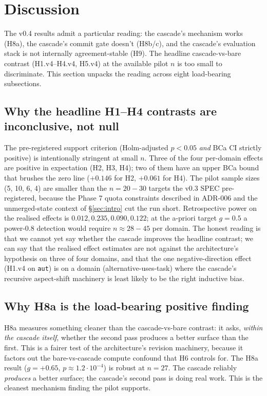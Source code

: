 \section{Discussion}\label{sec:discussion}

The v0.4 results admit a particular reading: the cascade's mechanism works (H8a), the cascade's commit gate doesn't (H8b/c), and the cascade's evaluation stack is not internally agreement-stable (H9). The headline cascade-vs-bare contrast (H1.v4--H4.v4, H5.v4) at the available pilot $n$ is too small to discriminate. This section unpacks the reading across eight load-bearing subsections.

\subsection{Why the headline H1--H4 contrasts are inconclusive, not null}

The pre-registered support criterion (Holm-adjusted $p<0.05$ \emph{and} BCa CI strictly positive) is intentionally stringent at small $n$. Three of the four per-domain effects are positive in expectation (H2, H3, H4); two of them have an upper BCa bound that brushes the zero line ($+0.146$ for H2, $+0.061$ for H4). The pilot sample sizes (5, 10, 6, 4) are smaller than the $n=20{-}30$ targets the v0.3 SPEC pre-registered, because the Phase 7 quota constraints described in ADR-006 and the unmerged-state context of \S\ref{sec:intro} cut the run short. Retrospective power on the realised effects is $0.012, 0.235, 0.090, 0.122$; at the a-priori target $g=0.5$ a power-0.8 detection would require $n\approx 28{-}45$ per domain. The honest reading is that we cannot yet say whether the cascade improves the headline contrast; we can say that the realised effect estimates are not against the architecture's hypothesis on three of four domains, and that the one negative-direction effect (H1.v4 on \texttt{aut}) is on a domain (alternative-uses-task) where the cascade's recursive aspect-shift machinery is least likely to be the right inductive bias.

\subsection{Why H8a is the load-bearing positive finding}

H8a measures something cleaner than the cascade-vs-bare contrast: it asks, \emph{within the cascade itself}, whether the second pass produces a better surface than the first. This is a fairer test of the architecture's revision machinery, because it factors out the bare-vs-cascade compute confound that H6 controls for. The H8a result ($g=+0.65$, $p\approx 1.2\!\cdot\! 10^{-4}$) is robust at $n=27$. The cascade reliably \emph{produces} a better surface; the cascade's second pass is doing real work. This is the cleanest mechanism finding the pilot supports.

